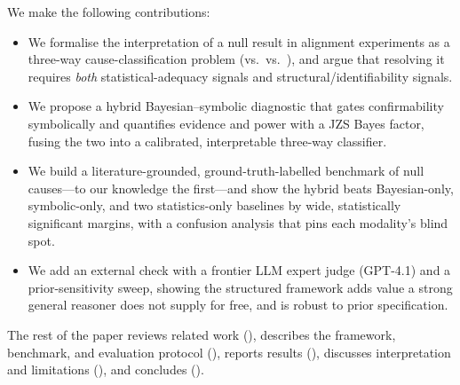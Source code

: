  We make the following contributions:
\begin{itemize}[leftmargin=*,itemsep=0pt,topsep=0pt]
  \item We formalise the interpretation of a null result in alignment experiments
        as a three-way cause-classification problem (\GR vs.\ \WI vs.\ \DF), and
        argue that resolving it requires \emph{both} statistical-adequacy signals
        and structural/identifiability signals.
  \item We propose a hybrid Bayesian--symbolic diagnostic that gates
        confirmability symbolically and quantifies evidence and power with a JZS
        Bayes factor, fusing the two into a calibrated, interpretable three-way
        classifier.
  \item We build a literature-grounded, ground-truth-labelled benchmark of null
        causes---to our knowledge the first---and show the hybrid beats
        Bayesian-only, symbolic-only, and two statistics-only baselines by wide,
        statistically significant margins, with a confusion analysis that pins
        each modality's blind spot.
  \item We add an external check with a frontier LLM expert judge (GPT-4.1) and a
        prior-sensitivity sweep, showing the structured framework adds value a
        strong general reasoner does not supply for free, and is robust to prior
        specification.
\end{itemize}

The rest of the paper reviews related work (), describes the
framework, benchmark, and evaluation protocol (), reports
results (), discusses interpretation and limitations
(), and concludes ().
